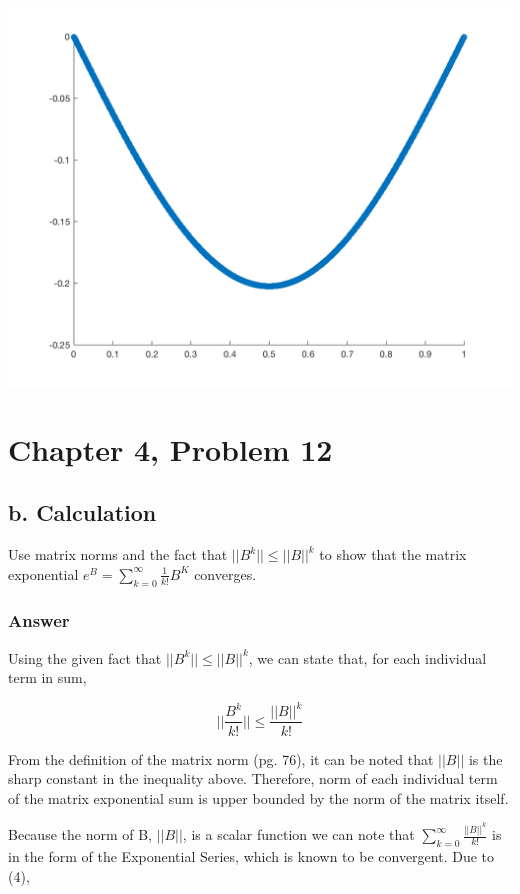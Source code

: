 \documentclass{article}
\newcommand{\n}{\newline}
\begin{document}
		\includegraphics[width=\textwidth]{scatter.png} 

	\section{Chapter 4, Problem 12}
		\subsection{b. Calculation}
		Use matrix norms and the fact that $||B^{k}||\leq||B||^{k}$ to show that the matrix exponential $e^{B}=\sum_{k=0}^{\infty}\frac{1}{k!}B^{K}$ converges.
		\subsubsection{Answer}
		
		Using the given fact that $||B^{k}||\leq||B||^{k}$, we can state that, for each individual term in sum, 
		
		\begin{equation}
			||\frac{B^{k}}{k!}||\leq\frac{||B||^{k}}{k!}
		\end{equation}
		
		From the definition of the matrix norm \cite{BG}(pg. 76), it can be noted that $||B||$ is the sharp constant in the inequality above.  Therefore, norm of each individual term of the matrix exponential sum is upper bounded by the norm of the matrix itself. \n
		
		Because the norm of B, $||B||$, is a scalar function we can note that $\sum_{k=0}^{\infty}\frac{||B||^k}{k!}$ is in the form of the Exponential Series, which is known to be convergent.  Due to (4),
		
\end{document}
